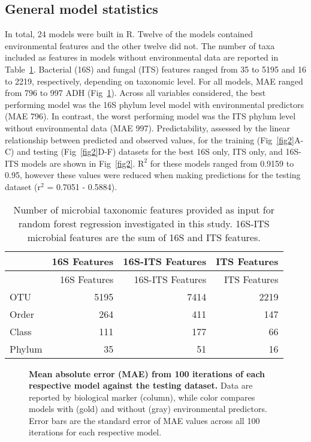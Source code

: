 \documentclass[
  10pt,
  letterpaper,
]{article}
\begin{document}
\hypertarget{general-model-statistics}{%
\subsection{General model statistics}\label{general-model-statistics}}

In total, 24 models were built in R. Twelve of the models contained
environmental features and the other twelve did not. The number of taxa
included as features in models without environmental data are reported
in Table~\ref{tbl-numfeatures}. Bacterial (16S) and fungal (ITS)
features ranged from 35 to 5195 and 16 to 2219, respectively, depending
on taxonomic level. For all models, MAE ranged from 796 to 997 ADH
(Fig~\ref{fig1}). Across all variables considered, the best performing
model was the 16S phylum level model with environmental predictors (MAE
796). In contrast, the worst performing model was the ITS phylum level
without environmental data (MAE 997). Predictability, assessed by the
linear relationship between predicted and observed values, for the
training (Fig~\ref{fig2}A-C) and testing (Fig~\ref{fig2}D-F) datasets
for the best 16S only, ITS only, and 16S-ITS models are shown in
Fig~\ref{fig2}. \(\mathrm{R}^2\) for these models ranged from 0.9159 to
0.95, however these values were reduced when making predictions for the
testing dataset (\(\mathrm{r}^2\) = 0.7051 - 0.5884).

\hypertarget{tbl-numfeatures}{}
\begin{longtable}[]{@{}lrrr@{}}
\caption{\label{tbl-numfeatures}Number of microbial taxonomic features
provided as input for random forest regression investigated in this
study. 16S-ITS microbial features are the sum of 16S and ITS
features.}\tabularnewline
\toprule\noalign{}
& 16S Features & 16S-ITS Features & ITS Features \\
\midrule\noalign{}
\endfirsthead
\toprule\noalign{}
& 16S Features & 16S-ITS Features & ITS Features \\
\midrule\noalign{}
\endhead
\bottomrule\noalign{}
\endlastfoot
OTU & 5195 & 7414 & 2219 \\
Order & 264 & 411 & 147 \\
Class & 111 & 177 & 66 \\
Phylum & 35 & 51 & 16 \\
\end{longtable}

\begin{figure}[!h]
\caption{{\bf Mean absolute error (MAE) from 100 iterations of each respective model against the testing dataset.}
Data are reported by biological marker (column), while color compares models with (gold) and without (gray) environmental predictors. Error bars are the standard error of MAE values across all 100 iterations for each respective model.}
\label{fig1}
\end{figure}
\end{document}
